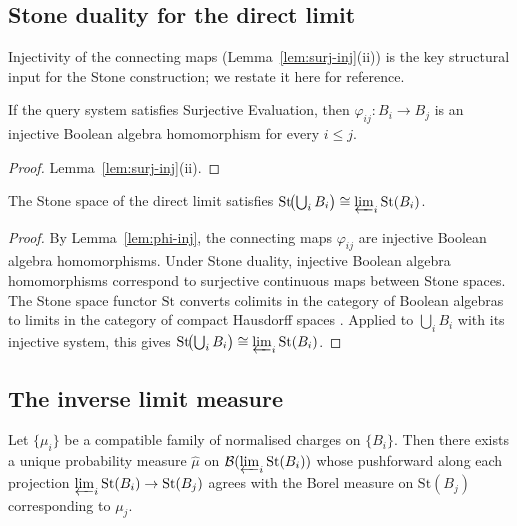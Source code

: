 \subsection{Stone duality for the direct limit}
\label{sec:stepA}

\noindent Injectivity of the connecting maps (Lemma~\ref{lem:surj-inj}(ii)) is the key structural input for the Stone construction; we restate it here for reference.

\begin{lemma}
\label{lem:phi-inj}
If the query system satisfies Surjective Evaluation, then $\varphi_{ij} : B_i \to B_j$ is an injective Boolean algebra homomorphism for every $i \leq j$.
\end{lemma}

\begin{proof}
Lemma~\ref{lem:surj-inj}(ii).
\end{proof}

\begin{proposition}
\label{prop:stepA}
The Stone space of the direct limit satisfies $\mathrm{St}\!\bigl(\bigcup_i B_i\bigr) \cong \varprojlim_i \mathrm{St}(B_i)$.
\end{proposition}

\begin{proof}
By Lemma~\ref{lem:phi-inj}, the connecting maps $\varphi_{ij}$ are injective Boolean algebra homomorphisms.  Under Stone duality, injective Boolean algebra homomorphisms correspond to surjective continuous maps between Stone spaces. The Stone space functor $\mathrm{St}$ converts colimits in the category of Boolean algebras to limits in the category of compact Hausdorff spaces
\cite[II.4]{johnstone1982}.  Applied to $\bigcup_i B_i$ with its injective
system, this gives $\mathrm{St}\!\bigl(\bigcup_i B_i\bigr) \cong \varprojlim_i \mathrm{St}(B_i)$.
\end{proof}

\subsection{The inverse limit measure}
\label{sec:invlim}

\begin{proposition}
\label{prop:invlim}
Let $\{\mu_i\}$ be a compatible family of normalised charges on $\{B_i\}$. Then there exists a unique probability measure $\hat{\mu}$ on $\mathcal{B}(\varprojlim_i \mathrm{St}(B_i))$ whose pushforward along each projection $\varprojlim_i \mathrm{St}(B_i) \to \mathrm{St}(B_j)$ agrees with the Borel measure on $\mathrm{St}(B_j)$ corresponding to $\mu_j$.
\end{proposition}

